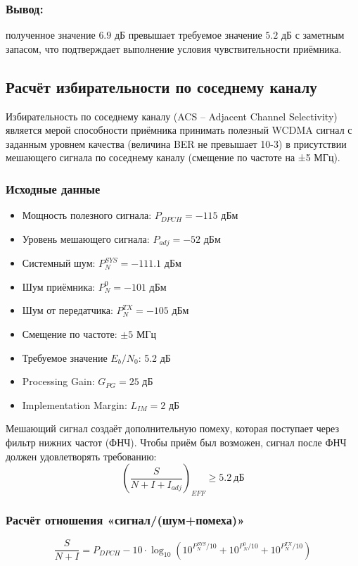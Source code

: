 \documentclass[a4paper,12pt]{article}
\begin{document}
\subsubsection{Вывод:} полученное значение $6.9$ дБ превышает требуемое значение $5.2$ дБ с заметным запасом, что подтверждает выполнение условия чувствительности приёмника.

\subsection{Расчёт избирательности по соседнему каналу}
Избирательность по соседнему каналу (ACS – Adjacent Channel Selectivity) является мерой способности приёмника принимать полезный WCDMA сигнал с заданным уровнем качества (величина BER не превышает 10-3) в присутствии мешающего сигнала по соседнему каналу (смещение по частоте на ±5 МГц).
\subsubsection{Исходные данные}
\begin{itemize}
\item Мощность полезного сигнала: $P_{DPCH} = -115$ дБм
\item Уровень мешающего сигнала: $P_{adj} = -52$ дБм
\item Системный шум: $P_{N}^{SYS} = -111.1$ дБм
\item Шум приёмника: $P_{N}^{0} = -101$ дБм
\item Шум от передатчика: $P_{N}^{TX} = -105$ дБм
\item Смещение по частоте: $\pm 5$ МГц
\item Требуемое значение $E_b/N_0$: 5.2 дБ
\item Processing Gain: $G_{PG} = 25$ дБ
\item Implementation Margin: $L_{IM} = 2$ дБ
\end{itemize}

Мешающий сигнал создаёт дополнительную помеху, которая поступает через фильтр нижних частот (ФНЧ). Чтобы приём был возможен, сигнал после ФНЧ должен удовлетворять требованию:
\begin{equation}
\left( \frac{S}{N + I + I_{adj}} \right)_{EFF} \geq 5.2\ \text{дБ}
\end{equation}



\subsubsection{Расчёт отношения «сигнал/(шум+помеха)»}
\begin{equation}
\frac{S}{N + I} = P_{DPCH} - 10 \cdot \log_{10} \left(10^{P_{N}^{SYS}/10} + 10^{P_{N}^{0}/10} + 10^{P_{N}^{TX}/10} \right)
\end{equation}
\end{document}
